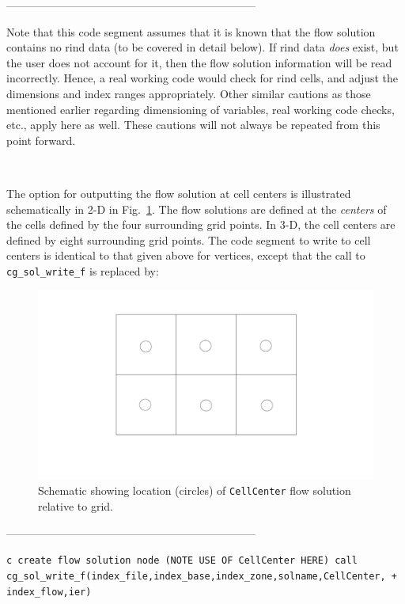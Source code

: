 \documentclass[12pt]{article}
\begin{document}
--------------------------------------------------------------------

\noindent Note that this code segment assumes that it is known that
the flow solution contains no rind data (to be covered in detail
below).  If rind data {\it does} exist, but the user does not
account for it, then the flow solution information will be read
incorrectly.  Hence, a real working code would check for rind
cells, and adjust the dimensions and index ranges appropriately.
Other similar cautions as those mentioned earlier regarding
dimensioning of variables, real working code checks, etc.,
apply here as well.  These cautions will not always be repeated from
this point forward.

~

\noindent{}

The option for outputting the flow solution at cell centers
is illustrated schematically in 2-D in
Fig.~\ref{FIGcellcenter}.  The flow solutions are defined at
the {\it centers} of the cells defined by the 
four surrounding grid points.  In 3-D,
the cell centers are defined by eight surrounding grid points.
The code segment to write to cell centers is identical to that given
above for vertices, except that the call to
{\tt cg\_sol\_write\_f} is replaced by:

\begin{figure}[hpbt]
\centerline{{\includegraphics[width=120mm]{figures/cellcenter}}}
\caption{Schematic showing location (circles) of {\tt CellCenter}
flow solution relative to grid.}
\label{FIGcellcenter}
\end{figure}
%

--------------------------------------------------------------------

{\tt \noindent c  create flow solution node (NOTE USE OF CellCenter HERE)
\newline\indent      call cg\_sol\_write\_f(index\_file,index\_base,index\_zone,solname,CellCenter,
\newline + \indent index\_flow,ier)}
\end{document}
